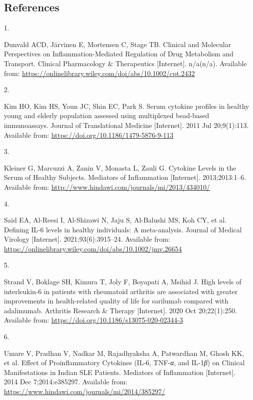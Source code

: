\documentclass[
  letterpaper,
  DIV=11,
  numbers=noendperiod,
  oneside]{scrartcl}
\newlength{\cslhangindent}
\newlength{\csllabelwidth}
\newenvironment{CSLReferences}[2] %
 {\begin{list}{}{%
  \setlength{\itemindent}{0pt}
  \setlength{\leftmargin}{0pt}
  \setlength{\parsep}{0pt}
  \ifodd #1
   \setlength{\leftmargin}{\cslhangindent}
   \setlength{\itemindent}{-1\cslhangindent}
  \fi
  \setlength{\itemsep}{#2\baselineskip}}}
 {\end{list}}
\newcommand{\CSLLeftMargin}[1]{\parbox[t]{\csllabelwidth}{\strut#1\strut}}
\newcommand{\CSLRightInline}[1]{\parbox[t]{\linewidth - \csllabelwidth}{\strut#1\strut}}
\begin{document}
\subsection*{References}\label{references}

\label{refs}
\begin{CSLReferences}{0}{1}
\CSLLeftMargin{1. }%
\CSLRightInline{Dunvald ACD, Järvinen E, Mortensen C, Stage TB. Clinical
and Molecular Perspectives on Inflammation-Mediated Regulation of Drug
Metabolism and Transport. Clinical Pharmacology \& Therapeutics
{[}Internet{]}. n/a(n/a). Available from:
\url{https://onlinelibrary.wiley.com/doi/abs/10.1002/cpt.2432}}

\CSLLeftMargin{2. }%
\CSLRightInline{Kim HO, Kim HS, Youn JC, Shin EC, Park S. Serum cytokine
profiles in healthy young and elderly population assessed using
multiplexed bead-based immunoassays. Journal of Translational Medicine
{[}Internet{]}. 2011 Jul 20;9(1):113. Available from:
\url{https://doi.org/10.1186/1479-5876-9-113}}

\CSLLeftMargin{3. }%
\CSLRightInline{Kleiner G, Marcuzzi A, Zanin V, Monasta L, Zauli G.
Cytokine Levels in the Serum of Healthy Subjects. Mediators of
Inflammation {[}Internet{]}. 2013;2013:1--6. Available from:
\url{http://www.hindawi.com/journals/mi/2013/434010/}}

\CSLLeftMargin{4. }%
\CSLRightInline{Said EA, Al-Reesi I, Al-Shizawi N, Jaju S, Al-Balushi
MS, Koh CY, et al. Defining IL-6 levels in healthy individuals: A
meta-analysis. Journal of Medical Virology {[}Internet{]}.
2021;93(6):3915--24. Available from:
\url{https://onlinelibrary.wiley.com/doi/abs/10.1002/jmv.26654}}

\CSLLeftMargin{5. }%
\CSLRightInline{Strand V, Boklage SH, Kimura T, Joly F, Boyapati A,
Msihid J. High levels of interleukin-6 in patients with rheumatoid
arthritis are associated with greater improvements in health-related
quality of life for sarilumab compared with adalimumab. Arthritis
Research \& Therapy {[}Internet{]}. 2020 Oct 20;22(1):250. Available
from: \url{https://doi.org/10.1186/s13075-020-02344-3}}

\CSLLeftMargin{6. }%
\CSLRightInline{Umare V, Pradhan V, Nadkar M, Rajadhyaksha A, Patwardhan
M, Ghosh KK, et al. Effect of Proinflammatory Cytokines (IL-6,
TNF-{\emph{α}}, and IL-1{\emph{β}}) on Clinical Manifestations in Indian
SLE Patients. Mediators of Inflammation {[}Internet{]}. 2014 Dec
7;2014:e385297. Available from:
\url{https://www.hindawi.com/journals/mi/2014/385297/}}


\end{CSLReferences}
\end{document}
